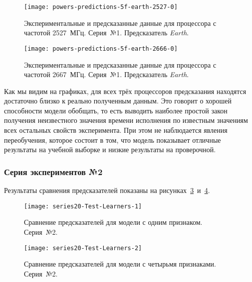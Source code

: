 \begin{figure}[H]
    \begin{center}
        \texttt{[image: powers-predictions-5f-earth-2527-0]}
        \caption{Экспериментальные и предсказанные данные для процессора с частотой 2527~МГц. Серия~№1. Предсказатель \textit{Earth}.}
        \label{img:powers-predictions-5f-earth-2527-0}
    \end{center}
\end{figure}

\begin{figure}[H]
    \begin{center}
        \texttt{[image: powers-predictions-5f-earth-2666-0]}
        \caption{Экспериментальные и предсказанные данные для процессора с частотой 2667~МГц. Серия~№1. Предсказатель \textit{Earth}.}
        \label{img:powers-predictions-5f-earth-2666-0}
    \end{center}
\end{figure}

Как мы видим на графиках, для всех трёх процессоров предсказания находятся достаточно близко к реально полученным данным. Это говорит о хорошей способности модели обобщать, то есть выводить наиболее простой закон получения неизвестного значения времени исполнения по известным значениям всех остальных свойств эксперимента. При этом не наблюдается явления переобучения, которое состоит в том, что модель показывает отличные результаты на учебной выборке и низкие результаты на проверочной.


\subsubsection{Серия экспериментов №2}

Результаты сравнения предсказателей показаны на рисунках~\ref{img:series20-Test-Learners-1}~и~\ref{img:series20-Test-Learners-2}.

\begin{figure}[H]
    \begin{center}
            \texttt{[image: series20-Test-Learners-1]}
            \caption{Сравнение предсказателей для модели с одним признаком. Серия~№2.} %
            \label{img:series20-Test-Learners-1} %
    \end{center}
\end{figure}

\begin{figure}[H]
    \begin{center}
            \texttt{[image: series20-Test-Learners-2]}
            \caption{Сравнение предсказателей для модели с четырьмя признаками. Серия~№2.}
            \label{img:series20-Test-Learners-2}
    \end{center}
\end{figure}


